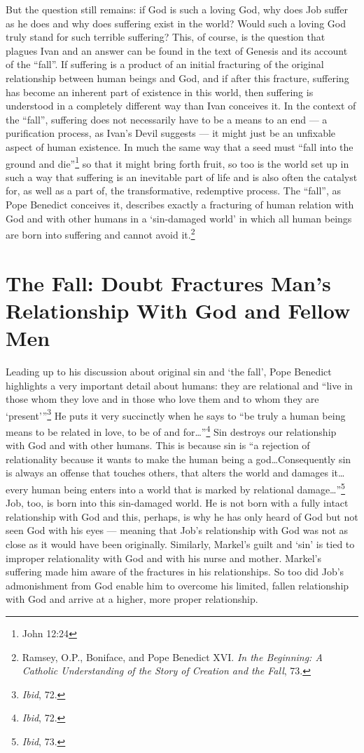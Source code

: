But the question still remains: if God is such a loving God, why does Job suffer as he does and why does suffering exist in the world? Would such a loving God truly stand for such terrible suffering? This, of course, is the question that plagues Ivan and an answer can be found in the text of Genesis and its account of the ``fall''. If suffering is a product of an initial fracturing of the original relationship between human beings and God, and if after this fracture, suffering has become an inherent part of existence in this world, then suffering is understood in a completely different way than Ivan conceives it. In the context of the ``fall'', suffering does not necessarily have to be a means to an end --- a purification process, as Ivan's Devil suggests --- it might just be an unfixable aspect of human existence. In much the same way that a seed must ``fall into the ground and die''\footnote{John 12:24} so that it might bring forth fruit, so too is the world set up in such a way that suffering is an inevitable part of life and is also often the catalyst for, as well as a part of, the transformative, redemptive process. The ``fall'', as Pope Benedict conceives it, describes exactly a fracturing of human relation with God and with other humans in a `sin-damaged world' in which all human beings are born into suffering and cannot avoid it.\footnote{Ramsey, O.P., Boniface, and Pope Benedict XVI. \emph{In the Beginning: A Catholic Understanding of the Story of Creation and the Fall}, 73.}

\section{The Fall: Doubt Fractures Man's Relationship With God and Fellow Men}
Leading up to his discussion about original sin and `the fall', Pope Benedict highlights a very important detail about humans: they are relational and ``live in those whom they love and in those who love them and to whom they are `present'''\footnote{\emph{Ibid}, 72.} He puts it very succinctly when he says to ``be truly a human being means to be related in love, to be of and for\ldots''\footnote{\emph{Ibid}, 72.} Sin destroys our relationship with God and with other humans. This is because sin is ``a rejection of relationality because it wants to make the human being a god\ldots Consequently sin is always an offense that touches others, that alters the world and damages it\ldots every human being enters into a world that is marked by relational damage\ldots''\footnote{\emph{Ibid}, 73.} Job, too, is born into this sin-damaged world. He is not born with a fully intact relationship with God and this, perhaps, is why he has only heard of God but not seen God with his eyes --- meaning that Job's relationship with God was not as close as it would have been originally. Similarly, Markel's guilt and `sin' is tied to improper relationality with God and with his nurse and mother. Markel's suffering made him aware of the fractures in his relationships. So too did Job's admonishment from God enable him to overcome his limited, fallen relationship with God and arrive at a higher, more proper relationship. 

